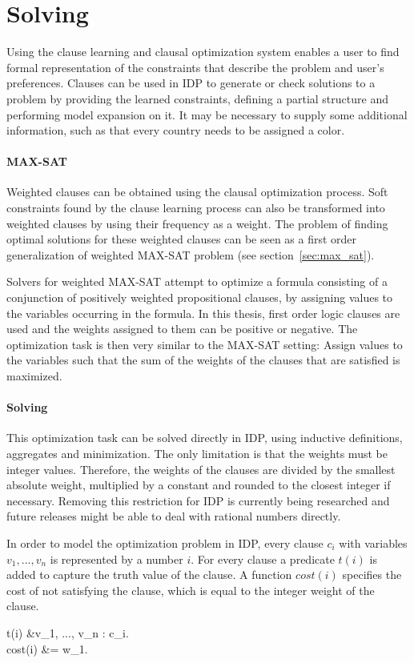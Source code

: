 \section{Solving}
Using the clause learning and clausal optimization system enables a user to find formal representation of the constraints that describe the problem and user's preferences.
Clauses can be used in IDP to generate or check solutions to a problem by providing the learned constraints, defining a partial structure and performing model expansion on it.
It may be necessary to supply some additional information, such as that every country needs to be assigned a color.

\paragraph{MAX-SAT}
Weighted clauses can be obtained using the clausal optimization process.
Soft constraints found by the clause learning process can also be transformed into weighted clauses by using their frequency as a weight.
The problem of finding optimal solutions for these weighted clauses can be seen as a first order generalization of weighted MAX-SAT problem (see section~\ref{sec:max_sat}).

Solvers for weighted MAX-SAT attempt to optimize a formula consisting of a conjunction of positively weighted propositional clauses, by assigning values to the variables occurring in the formula.
In this thesis, first order logic clauses are used and the weights assigned to them can be positive or negative.
The optimization task is then very similar to the MAX-SAT setting:
Assign values to the variables such that the sum of the weights of the clauses that are satisfied is maximized.

\paragraph{Solving}
This optimization task can be solved directly in IDP, using inductive definitions, aggregates and minimization.
The only limitation is that the weights must be integer values.
Therefore, the weights of the clauses are divided by the smallest absolute weight, multiplied by a constant and rounded to the closest integer if necessary.
Removing this restriction for IDP is currently being researched and future releases might be able to deal with rational numbers directly.

In order to model the optimization problem in IDP, every clause $c_i$ with variables $v_1, ..., v_n$ is represented by a number $i$. For every clause a predicate $t(i)$ is added to capture the truth value of the clause.
A function $\mathit{cost}(i)$ specifies the cost of not satisfying the clause, which is equal to the integer weight of the clause.
\begin{shiftedflalign*}
	t(i) &\Leftrightarrow \forall v_1, ..., v_n : c_i. \\
	cost(i) &= w_1.
\end{shiftedflalign*}

